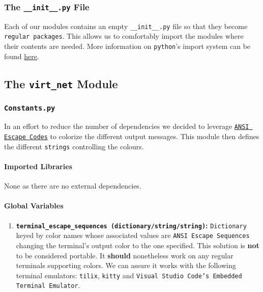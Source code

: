             \subsubsection{The \texttt{\_\_init\_\_.py} File}
                Each of our modules contains an empty \texttt{\_\_init\_\_.py} file so that they become \texttt{regular packages}. This allows us to comfortably import the modules where their contents are needed. More information on \texttt{python}'s import system can be found \href{https://docs.python.org/3/reference/import.html#regular-packages}{here}.

        \subsection{The \texttt{virt\_net} Module}
            \subsubsection{\texttt{Constants.py}}
                In an effort to reduce the number of dependencies we decided to leverage \href{https://en.wikipedia.org/wiki/ANSI_escape_code}{\texttt{ANSI Escape Codes}} to colorize the different output messages. This module then defines the different \texttt{strings} controlling the colours.

                \paragraph{Imported Libraries}
                    None as there are no external dependencies.

                \paragraph{Global Variables}
                    \begin{enumerate}
                        \item \textbf{\texttt{terminal\_escape\_sequences (dictionary/string/string)}:} \texttt{Dictionary} keyed by color names whose associated values are \texttt{ANSI Escape Sequences} changing the terminal's output color to the one specified. This solution is \textbf{not} to be considered portable. It \textbf{should} nonetheless work on any regular terminals supporting colors. We can assure it works with the following terminal emulators: \texttt{tilix}, \texttt{kitty} and \texttt{Visual Studio Code's Embedded Terminal Emulator}.
                    \end{enumerate}


